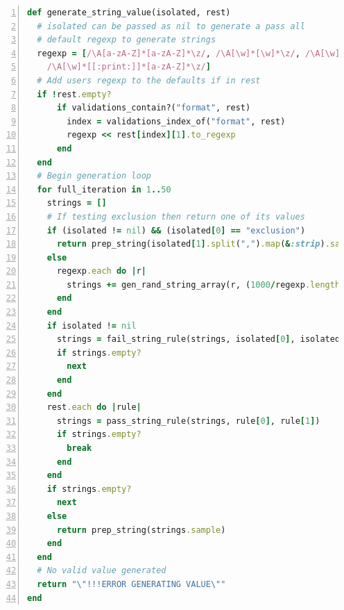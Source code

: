 \documentclass[a4paper,12pt]{article}
\begin{document}
\begin{lstlisting}[frame=single,numbers=left,language = ruby,caption= {generate\_string\_value}, label={code:genstrval}]
def generate_string_value(isolated, rest)
  # isolated can be passed as nil to generate a pass all
  # default regexp to generate strings
  regexp = [/\A[a-zA-Z]*[a-zA-Z]*\z/, /\A[\w]*[\w]*\z/, /\A[\w]*[[:punct:]]*[\w]*\z/, 
    /\A[\w]*[[:print:]]*[a-zA-Z]*\z/]
  # Add users regexp to the defaults if in rest
  if !rest.empty?
      if validations_contain?("format", rest)
        index = validations_index_of("format", rest)
        regexp << rest[index][1].to_regexp
      end
  end
  # Begin generation loop
  for full_iteration in 1..50
    strings = []
    # If testing exclusion then return one of its values 
    if (isolated != nil) && (isolated[0] == "exclusion")
      return prep_string(isolated[1].split(",").map(&:strip).sample) 
    else
      regexp.each do |r|
        strings += gen_rand_string_array(r, (1000/regexp.length))
      end
    end
    if isolated != nil
      strings = fail_string_rule(strings, isolated[0], isolated[1])
      if strings.empty?
        next
      end
    end
    rest.each do |rule|
      strings = pass_string_rule(strings, rule[0], rule[1])
      if strings.empty?
        break
      end
    end
    if strings.empty?
      next
    else
      return prep_string(strings.sample)
    end     
  end
  # No valid value generated
  return "\"!!!ERROR GENERATING VALUE\""
end
\end{lstlisting}
\end{document}
